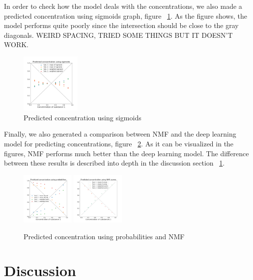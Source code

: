 \documentclass{article}
\begin{document}
In order to check how the model deals with the concentrations, we also made a predicted concentration using sigmoids graph, figure ~\ref{fig:conc_sigmoids}. As the figure shows, the model performs quite poorly since the intersection should be close to the gray diagonals. WEIRD SPACING, TRIED SOME THINGS BUT IT DOESN'T WORK.
\begin{figure}[H]
	\centering
	\includegraphics[width=0.26\textwidth]{figures_2/DNN_pred_conc_sigmoid.png} 
	\caption{Predicted concentration using sigmoids}
	\label{fig:conc_sigmoids}
\end{figure}
Finally, we also generated a comparison between NMF and the deep learning model for predicting concentrations, figure ~\ref{fig:comparison}. As it can be visualized in the figures, NMF performs much better than the deep learning model. The difference between these results is described into depth in the discussion section ~\ref{sec:discussion}.
\begin{figure}[H]
	\includegraphics[width=0.23\textwidth]{figures_2/DNN_pred_conc_prob.png}
	\includegraphics[width=0.23\textwidth]{figures_2/nmf_pred_conc.png}
	\caption{Predicted concentration using probabilities and NMF}
	\label{fig:comparison}
\end{figure}
\section{Discussion}
\label{sec:discussion}
\end{document}
